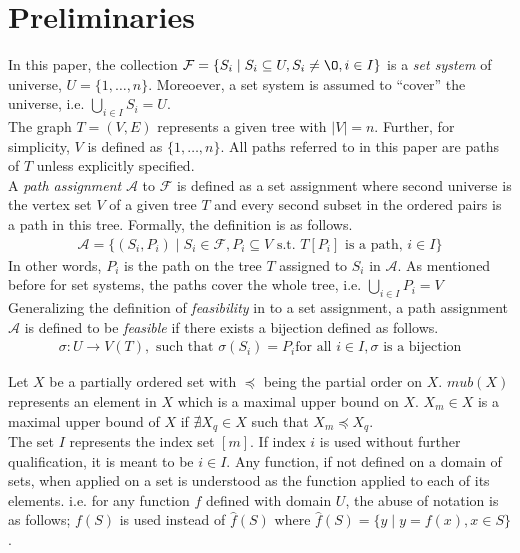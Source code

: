 \documentclass{llncs}
\def\F{{\mathcal F}}
\def\A{{\mathcal A}}
\begin{document}
\section{Preliminaries} \label{prelims}
In this paper, the collection $\F = \{S_i \mid S_i \subseteq U, S_i
\ne \O, i \in I\}$ is a {\em set system} of universe, $U = \{1,
\ldots, n\}$. Moreoever, a set system is assumed to ``cover'' the universe,
i.e. $ \bigcup_{i \in I}S_i = U$. \\

\noindent
The graph $T=(V,E)$ represents a given tree with $|V| = n$. Further,
for simplicity, $V$ is defined as $\{1,\ldots,n\}$. All paths
referred to in this paper are paths of $T$ unless explicitly specified. \\

\noindent
A {\em path assignment} $\A$ to $\F$ is defined as a set assignment
where second universe is the vertex set $V$ of a given tree $T$ and
every second subset in the ordered pairs is a path in this tree. Formally, the definition is as follows.
\begin{align*}
  \A = \{ (S_i,P_i) \mid  S_i \in \F, P_i \subseteq V \text{ s.t. }T[P_i]
  \text{ is a path, } i \in I \}
\end{align*}
In other words, $P_i$ is the path on the tree $T$ assigned to $S_i$ in
$\A$. As mentioned before for set systems, the paths cover the whole
tree, i.e. $\bigcup_{i \in I}P_i = V$ \\

\noindent
Generalizing the definition of {\em feasibility} in \cite{nsnrs09} to
a set assignment, a path assignment $\A$ is defined to be {\em
  feasible} if there exists a bijection defined as follows.
\begin{align}
  \sigma: U \rightarrow V(T), \text{ such that }\sigma(S_i) = P_i \text{
    for all } i \in I, \sigma \text{ is a bijection}
\label{eq:stf}
\end{align}


\noindent
Let $X$ be a partially ordered set with $\preccurlyeq$ being the partial order on $X$.  
$mub(X)$ represents an element in $X$ which is a maximal upper bound on $X$.  $X_m \in X$ is a maximal upper bound of
$X$ if $\nexists X_q \in X$ such that $X_m
\preccurlyeq X_q$. \\

\noindent
The set $I$ represents the index set $[m]$. If index $i$ is used
without further qualification, it is meant to be $i \in I$. Any
function, if not defined on a domain of sets, when applied on a set is
understood as the function applied to 
each of its elements. i.e. for any function $f$ defined with domain $U$, the abuse of
notation is as follows; $f(S)$ is used instead of $\hat f(S)$ where
$\hat f(S) = \{y \mid y = f(x), x \in S\}$. \\
\end{document}
